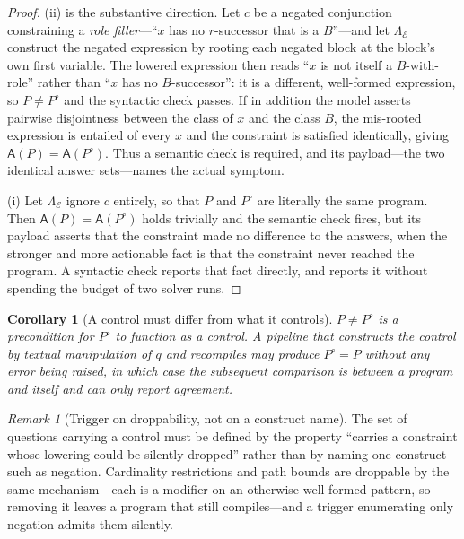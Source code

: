 \documentclass[11pt,a4paper]{article}
\theoremstyle{plain}
\newtheorem{corollary}[theorem]{Corollary}
\theoremstyle{definition}
\theoremstyle{remark}
\newtheorem{remark}[theorem]{Remark}
\newcommand{\Engine}{\mathcal{E}}         %
\newcommand{\Ans}{\mathsf{A}}             %
\newcommand{\lowr}{\Lambda}               %
\newcommand{\qq}{q}
\begin{document}
\begin{proof}
(ii) is the substantive direction. Let $c$ be a negated conjunction
constraining a \emph{role filler}---``$x$ has no $r$-successor that is a
$B$''---and let $\lowr_\Engine$ construct the negated expression by rooting
each negated block at the block's own first variable. The lowered expression
then reads ``$x$ is not itself a $B$-with-role'' rather than ``$x$ has no
$B$-successor'': it is a different, well-formed expression, so $P \neq P^\circ$
and the syntactic check passes. If in addition the model asserts pairwise
disjointness between the class of $x$ and the class $B$, the mis-rooted
expression is entailed of every $x$ and the constraint is satisfied
identically, giving $\Ans(P) = \Ans(P^\circ)$. Thus a semantic check is
required, and its payload---the two identical answer sets---names the actual
symptom.

(i) Let $\lowr_\Engine$ ignore $c$ entirely, so that $P$ and $P^\circ$ are
literally the same program. Then $\Ans(P) = \Ans(P^\circ)$ holds trivially and
the semantic check fires, but its payload asserts that the constraint made no
difference to the answers, when the stronger and more actionable fact is that
the constraint never reached the program. A syntactic check reports that fact
directly, and reports it without spending the budget of two solver runs.
\end{proof}

\begin{corollary}[A control must differ from what it controls]
\label{cor:control-differs}
$P \neq P^\circ$ is a precondition for $P^\circ$ to function as a control. A
pipeline that constructs the control by textual manipulation of $\qq$ and
recompiles may produce $P^\circ = P$ without any error being raised, in which
case the subsequent comparison is between a program and itself and can only
report agreement.
\end{corollary}

\begin{remark}[Trigger on droppability, not on a construct name]
\label{rem:trigger}
The set of questions carrying a control must be defined by the property
``carries a constraint whose lowering could be silently dropped'' rather than
by naming one construct such as negation. Cardinality restrictions and path
bounds are droppable by the same mechanism---each is a modifier on an
otherwise well-formed pattern, so removing it leaves a program that still
compiles---and a trigger enumerating only negation admits them silently.
\end{remark}
\end{document}
